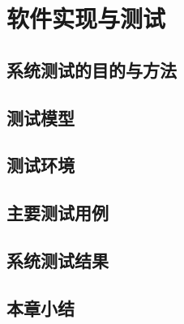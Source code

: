 
\chapter{软件实现与测试}

\section{系统测试的目的与方法}
\section{测试模型}
\section{测试环境}
\section{主要测试用例}
\section{系统测试结果}
\section{本章小结}